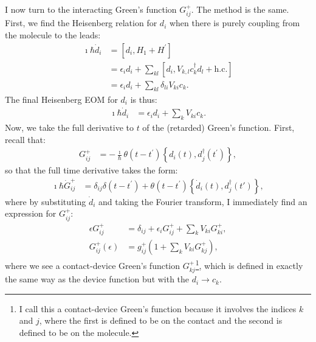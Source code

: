 I now turn to the interacting Green's function $G_{ij}^+$. The method is the same.
First, we find the Heisenberg relation for $d_i$ when there is purely coupling from the molecule to the leads:
\begin{align*}
\imath \hbar \dot{d}_i &= \left[ d_i, H_1 + H^\prime\right] \\
&=\epsilon_i d_i + \sum_{kl}\left[d_i, V_{k, l} c^\dagger_{k} d_l + \text{h.c.}\right] \\
&=\epsilon_i d_i + \sum_{kl}\delta_{li} V_{ki} c_{k}.
\end{align*}
The final Heisenberg EOM for $d_i$ is thus:
\begin{align}
\imath \hbar \dot{d}_i &= \epsilon_i d_i + \sum_{k}V_{ki} c_{k} \label{eq:heisenbergdotd}.
\end{align}
Now, we take the full derivative to $t$ of the (retarded) Green's function. First, recall that:
\begin{align*}
G_{ij}^+ &= - \frac{\imath}{\hbar} \theta(t-t^\prime) \left\{ d_i(t), d_j^\dagger(t^\prime) \right\},
\end{align*}
so that the full time derivative takes the form:
\begin{align}
\imath\hbar \dot{G}_{ij}^+ &= \delta_{ij} \delta(t - t^\prime) + \theta(t-t^\prime) \left\{ \dot{d}_i (t), d_j^\dagger (t')\right\},
\label{eq:eomgf}
\end{align} where by substituting $\dot{d}_i$ and taking the Fourier transform, I immediately find an expression for $G_{ij}^+$:
\begin{align*} 
\epsilon G_{ij}^+ &= \delta_{ij} + \epsilon_i G^+_{ij}+ \sum_k V_{ki} G^+_{ki},\\
G_{ij}^+ (\epsilon) &= g_{ij}^+ \left( 1 + \sum_{k} V_{ki} G_{kj}^+ \right),
\end{align*} where we see a contact-device Green's function $G_{kj}^+$\footnote{I call this a contact-device Green's function because it involves the indices $k$ and $j$, where the first is defined to be on the contact and the second is defined to be on the molecule.}, which is defined in exactly the same way as the device function but with the $d_i \rightarrow c_{k}$.

